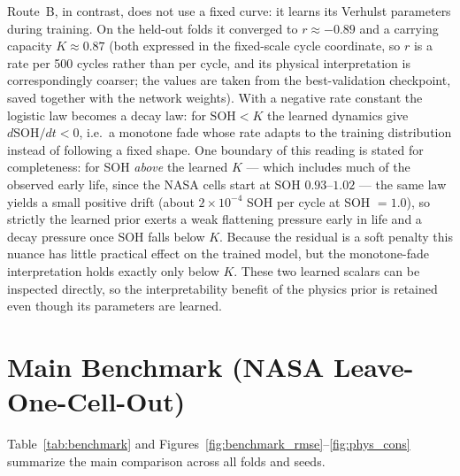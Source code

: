 Route~B, in contrast, does not use a fixed curve: it learns its Verhulst
parameters during training. On the held-out folds it converged to
$r\approx-0.89$ and a carrying capacity $K\approx0.87$ (both expressed in the
fixed-scale cycle coordinate, so $r$ is a rate per 500 cycles rather than per
cycle, and its physical interpretation is correspondingly coarser; the values
are taken from the best-validation checkpoint, saved together with the network
weights). With a negative rate constant the logistic law becomes a decay law:
for $\mathrm{SOH} < K$ the learned dynamics give $d\mathrm{SOH}/dt<0$, i.e.\ a
monotone fade whose rate adapts to the training distribution instead of
following a fixed shape. One boundary of this reading is stated for
completeness: for SOH \emph{above} the learned $K$ --- which includes much of
the observed early life, since the NASA cells start at SOH $0.93$--$1.02$ ---
the same law yields a small positive drift (about $2\times10^{-4}$ SOH per
cycle at SOH $=1.0$), so strictly the learned prior exerts a weak flattening
pressure early in life and a decay pressure once SOH falls below $K$. Because
the residual is a soft penalty this nuance has little practical effect on the
trained model, but the monotone-fade interpretation holds exactly only below
$K$. These two learned scalars can be inspected directly, so
the interpretability benefit of the physics prior is retained even though its
parameters are learned.

\section{Main Benchmark (NASA Leave-One-Cell-Out)}
\label{sec:main_benchmark}

Table~\ref{tab:benchmark} and Figures~\ref{fig:benchmark_rmse}--\ref{fig:phys_cons}
summarize the main comparison across all folds and seeds.

